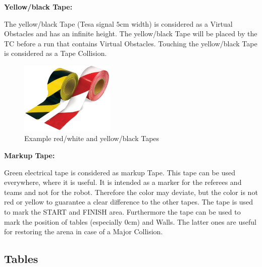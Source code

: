 \textbf{Yellow/black Tape:}

The yellow/black Tape (Tesa signal $5\si{\centi\meter}$ width) is considered as a Virtual Obstacles and has an infinite height. The yellow/black Tape will be placed by the TC before a run that contains Virtual Obstacles. Touching the yellow/black Tape is considered as a Tape Collision.

\begin{figure} [h!]
	\centering
	\includegraphics[width= 0.4\textwidth ]{./images/general_rules/example_barrier_tape}
	\caption{Example red/white and yellow/black Tapes}
	\label{fig:tapes}
\end{figure}

\textbf{Markup Tape:}

Green electrical tape is considered as markup Tape. This tape can be used everywhere, where it is useful. It is intended as a marker for the referees and teams and not for the robot. Therefore the color may deviate, but the color is not red or yellow to guarantee a clear difference to the other tapes. The tape is used to mark the START and FINISH area. Furthermore the tape can be used to mark the position of tables (especially $0\si{\centi\meter}$) and Walls. The latter ones are useful for restoring the arena in case of a Major Collision.


\subsection{Tables}
\label{subsec: Tables}




